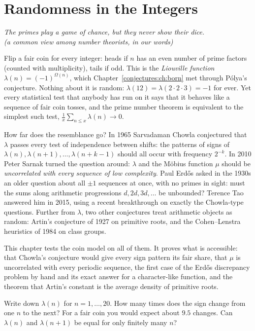 \chapter{Randomness in the Integers}\label{conjectures:ch:random}

\begin{center}\itshape
The primes play a game of chance, but they never show their dice.\\
\upshape(a common view among number theorists, in our words)
\end{center}

Flip a fair coin for every integer: heads if $n$ has an even number of prime factors (counted with multiplicity), tails if odd. This is the
\emph{Liouville function} $\lambda(n)=(-1)^{\Omega(n)}$, which Chapter~\ref{conjectures:ch:born} met through P\'olya's conjecture. Nothing about it is random:
$\lambda(12)=\lambda(2\cdot2\cdot3)=-1$ for ever. Yet every statistical test that anybody has run on it says that it behaves like a sequence of fair coin
tosses, and the prime number theorem is equivalent to the simplest such test, $\frac1x\sum_{n\le x}\lambda(n)\to0$.

How far does the resemblance go? In 1965 Sarvadaman Chowla conjectured that $\lambda$ passes every test of independence between shifts: the patterns of
signs of $\lambda(n),\lambda(n+1),\dots,\lambda(n+k-1)$ should all occur with frequency $2^{-k}$. In 2010 Peter Sarnak turned the question around: $\lambda$ and
the M\"obius function $\mu$ should be \emph{uncorrelated with every sequence of low complexity}. Paul Erd\H os asked in the 1930s an older question about all
$\pm1$ sequences at once, with no primes in sight: must the sums along arithmetic progressions $d,2d,3d,\dots$ be unbounded? Terence Tao answered him in
2015, using a recent breakthrough on exactly the Chowla-type questions. Further from $\lambda$, two other conjectures treat arithmetic objects as random:
Artin's conjecture of 1927 on primitive roots, and the Cohen--Lenstra heuristics of 1984 on class groups.

This chapter tests the coin model on all of them. It proves what is accessible: that Chowla's conjecture would give every sign pattern its fair share,
that $\mu$ is uncorrelated with every periodic sequence, the first case of the Erd\H os discrepancy problem by hand and its exact answer for a character-like
function, and the theorem that Artin's constant is the average density of primitive roots.

\begin{think}
Write down $\lambda(n)$ for $n=1,\dots,20$. How many times does the sign change from one $n$ to the next? For a fair coin you would expect about $9.5$
changes. Can $\lambda(n)$ and $\lambda(n+1)$ be equal for only finitely many $n$?
\end{think}

